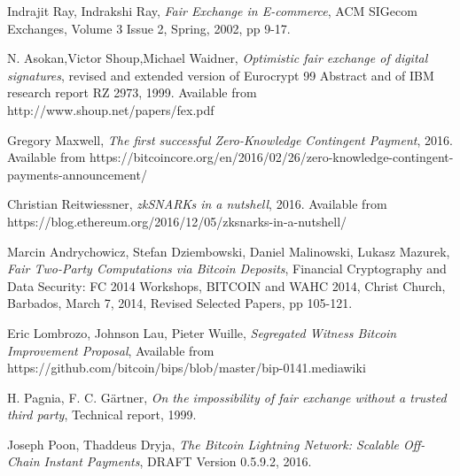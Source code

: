 \documentclass[]{article}
\begin{document}
\begin{thebibliography}{9}
	Indrajit Ray, Indrakshi Ray, 
	\textit{Fair Exchange in E-commerce},
	ACM SIGecom Exchanges, Volume 3 Issue 2, Spring, 2002,
	pp 9-17. 
	
	    N. Asokan,Victor Shoup,Michael Waidner,
	    \textit{Optimistic fair exchange of digital signatures},
	    revised and extended version of Eurocrypt 99 Abstract and of IBM research report RZ 2973, 1999. Available from http://www.shoup.net/papers/fex.pdf
		
	Gregory Maxwell,
	\textit{The first successful Zero-Knowledge Contingent Payment}, 2016.
	Available from https://bitcoincore.org/en/2016/02/26/zero-knowledge-contingent-payments-announcement/
	
	Christian Reitwiessner,
	\textit{zkSNARKs in a nutshell}, 2016.
	Available from
	https://blog.ethereum.org/2016/12/05/zksnarks-in-a-nutshell/
	
	Marcin Andrychowicz, Stefan Dziembowski, Daniel Malinowski, Lukasz Mazurek,
	\textit{Fair Two-Party Computations via Bitcoin Deposits}, Financial Cryptography and Data Security: FC 2014 Workshops, BITCOIN and WAHC 2014, Christ Church, Barbados, March 7, 2014, Revised Selected Papers, pp 105-121.
	
	Eric Lombrozo, Johnson Lau, Pieter Wuille,
	\textit{Segregated Witness Bitcoin Improvement Proposal},
	Available from https://github.com/bitcoin/bips/blob/master/bip-0141.mediawiki
	
	H. Pagnia, F. C. Gärtner, 
	\textit{On the impossibility of fair exchange without a trusted
	third party}, Technical report, 1999.

	Joseph Poon, Thaddeus Dryja,
	\textit{The Bitcoin Lightning Network: Scalable Off-Chain Instant Payments}, DRAFT Version 0.5.9.2, 2016.
	    
\end{thebibliography}
\end{document}
